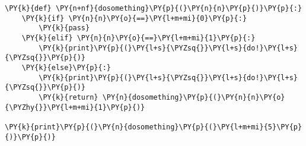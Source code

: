 \begin{Verbatim}[commandchars=\\\{\}]
\PY{k}{def} \PY{n+nf}{dosomething}\PY{p}{(}\PY{n}{n}\PY{p}{)}\PY{p}{:}
    \PY{k}{if} \PY{n}{n}\PY{o}{==}\PY{l+m+mi}{0}\PY{p}{:}
        \PY{k}{pass}
    \PY{k}{elif} \PY{n}{n}\PY{o}{==}\PY{l+m+mi}{1}\PY{p}{:}
        \PY{k}{print}\PY{p}{(}\PY{l+s}{\PYZsq{}}\PY{l+s}{do!}\PY{l+s}{\PYZsq{}}\PY{p}{)}
    \PY{k}{else}\PY{p}{:}
        \PY{k}{print}\PY{p}{(}\PY{l+s}{\PYZsq{}}\PY{l+s}{do!}\PY{l+s}{\PYZsq{}}\PY{p}{)}
        \PY{k}{return} \PY{n}{dosomething}\PY{p}{(}\PY{n}{n}\PY{o}{\PYZhy{}}\PY{l+m+mi}{1}\PY{p}{)}

\PY{k}{print}\PY{p}{(}\PY{n}{dosomething}\PY{p}{(}\PY{l+m+mi}{5}\PY{p}{)}\PY{p}{)}
\end{Verbatim}
